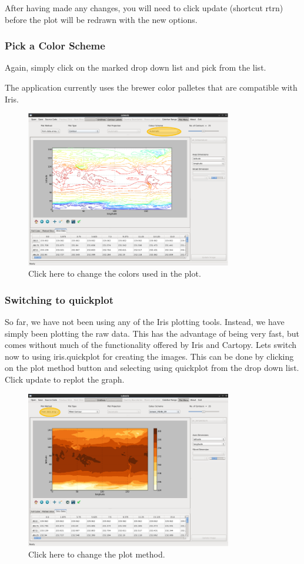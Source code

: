 \documentclass[a4paper,12pt]{article}
\begin{document}
After having made any changes, you will need to click update (shortcut rtrn)
before the plot will be redrawn with the new options.

\subsubsection{Pick a Color Scheme}

Again, simply click on the marked drop down list and pick from the list.

The application currently uses the brewer color palletes that are compatible
with Iris.

\begin{figure}[H]
\centering
\includegraphics[width=90mm]{resources/tute6.PNG}
\caption{Click here to change the colors used in the plot.}

\label{overflow}
\end{figure}

\subsubsection{Switching to quickplot}

So far, we have not been using any of the Iris plotting tools. Instead, we have
simply been plotting the raw data. This has the advantage of being very fast,
but comes without much of the functionality offered by Iris and Cartopy. Lets
switch now to using iris.quickplot for creating the images. This can be done
by clicking on the plot method button and selecting using quickplot from the
drop down list. Click update to replot the graph.

\begin{figure}[H]
\centering
\includegraphics[width=90mm]{resources/tute7.PNG}
\caption{Click here to change the plot method.}
\label{overflow}
\end{figure}
\end{document}
